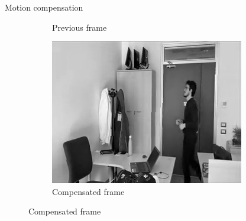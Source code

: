 \documentclass[aspectratio=1610,xcolor=dvipsnames]{beamer}
\begin{document}
\begin{frame}{Motion compensation}
\begin{figure}[htbp]
\begin{subfigure}[b]{0.3\textwidth}
            \caption{Previous frame}
            \label{fig:pan240-curr-frame}
        \end{subfigure}
        \hfill
        \begin{subfigure}[b]{0.3\textwidth}
            \includegraphics[width=.9\textwidth]{images/pan240-compensated.png}
            \caption{Compensated frame}
            \label{fig:pan240-compensated}
        \end{subfigure}
        

\end{figure}
\end{frame}
\end{document}

